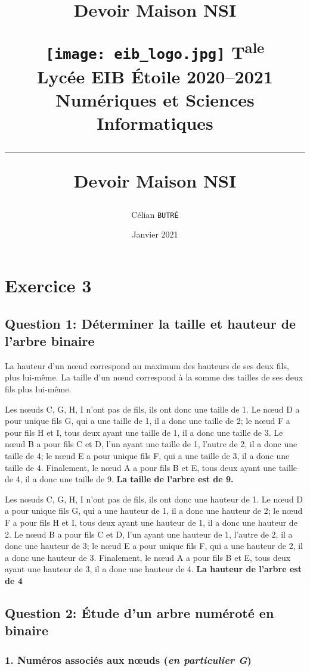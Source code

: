 \documentclass[a4paper,12pt]{article}
\title{Devoir Maison NSI}
\author{Célian \tt {BUTRÉ}}
\date{Janvier 2021}
\title{
{\normalsize
\vspace*{-1.5cm}
\texttt{[image: eib\_logo.jpg]}
% 
\hfill
T\textsuperscript{ale}\\
Lycée EIB \'Etoile 2020--2021
\hfill
{\sc Numériques et Sciences Informatiques}
\hrule%
\vspace{5mm}%
}
{\sc Devoir Maison NSI}}
\begin{document}
\maketitle
\thispagestyle{fancy}

\section*{Exercice 3}




\subsection*{Question 1: Déterminer la taille et hauteur de l'arbre binaire}

La hauteur d'un n\oe{}ud correspond au maximum des hauteurs de ses deux fils, plus lui-même. La taille d'un n\oe{}ud correspond à la somme des tailles de ses deux fils plus lui-même.

Les n\oe{}uds C, G, H, I n'ont pas de fils, ils ont donc une taille de 1. Le n\oe{}ud D a pour unique fils G, qui a une taille de 1, il a donc une taille de 2; le n\oe{}ud F a pour fils H et I, tous deux ayant une taille de 1, il a donc une taille de 3. Le n\oe{}ud B a pour fils C et D, l'un ayant une taille de 1, l'autre de 2, il a donc une taille de 4; le n\oe{}ud E a pour unique fils F, qui a une taille de 3, il a donc une taille de 4. Finalement, le n\oe{}ud A a pour fils B et E, tous deux ayant une taille de 4, il a donc une taille de 9. {\bf La taille de l'arbre est de 9.}

Les n\oe{}uds C, G, H, I n'ont pas de fils, ils ont donc une hauteur de 1. Le n\oe{}ud D a pour unique fils G, qui a une hauteur de 1, il a donc une hauteur de 2; le n\oe{}ud F a pour fils H et I, tous deux ayant une hauteur de 1, il a donc une hauteur de 2. Le n\oe{}ud B a pour fils C et D, l'un ayant une hauteur de 1, l'autre de 2, il a donc une hauteur de 3; le n\oe{}ud E a pour unique fils F, qui a une hauteur de 2, il a donc une hauteur de 3. Finalement, le n\oe{}ud A a pour fils B et E, tous deux ayant une hauteur de 3, il a donc une hauteur de 4. {\bf La hauteur de l'arbre est de 4}


\subsection*{Question 2: Étude d'un arbre numéroté en binaire}

\subsubsection*{1. Numéros associés aux n\oe{}uds ({\em en particulier G})}
\end{document}
